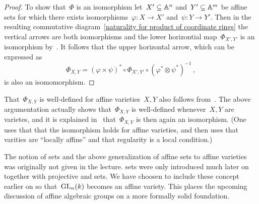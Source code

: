 \begin{proof}
  
  To show that~$\Phi$ is an isomorphism let~$X' \subseteq \mathbb{A}^n$ and~$Y' \subseteq \mathbb{A}^m$ be affine sets for which there exists isomorphisms~$\varphi \colon X \to X'$ and~$\psi \colon Y \to Y'$.
  Then in the resulting commutative diagram~\eqref{naturality for product of coordinate rings} the vertical arrows are both isomorphisms and the lower horizontial map~$\Phi_{X', Y'}$ is an isomorphism by~.
  It follows that the upper horizontal arrow, which can be expressed as
  \begin{equation}
  \label{isomorphism for affine varieties}
      \Phi_{X,Y}
    = (\varphi \times \psi)^* \circ \Phi_{X',Y'} \circ ( \varphi^* \otimes \psi^* )^{-1} \,,
  \end{equation}
  is also an isomomorphism.
\end{proof}


\begin{remark}
  That~$\Phi_{X,Y}$ is well-defined for affine varieties~$X,Y$ also follows from~.
  The above argumentation actually shows that~$\Phi_{X,Y}$ is well-defined whenever~$X,Y$ are {\qaffine} varietes, and it is explained in~\cite{MO267198} that~$\Phi_{X,Y}$ is then again an isomorphism.
  (One uses that that the isomorphism holds for affine varieties, and then uses that {\qaffine} varities are \enquote{locally affine} and that regularity is a local condition.)
\end{remark}


\begin{metaremark}
  The notion of {\qaffine} sets and the above generalization of affine sets to affine varieties was originally not given in the lecture.
  {\Qaffine} sets were only introduced much later on together with projective and {\qprojective} sets.
  We have choosen to include these concept earlier on so that~$\operatorname{GL}_n(k)$ becomes an affine variety.
  This places the upcoming discussion of affine algebraic groups on a more formally solid foundation.
\end{metaremark}












